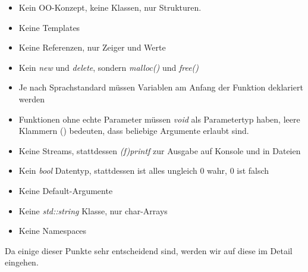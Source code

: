 \documentclass[
  accentcolor=tud1c,	%
  colorbacktitle,		%
  inverttitle,			%
  german,				%
  twoside
]{tudexercise}
\begin{document}
\begin{itemize}
\item Kein OO-Konzept, keine Klassen, nur Strukturen.
\item Keine Templates
\item Keine Referenzen, nur Zeiger und Werte
\item Kein \emph{new} und \emph{delete}, sondern \emph{malloc()} und \emph{free()}
\item Je nach Sprachstandard müssen Variablen am Anfang der Funktion deklariert werden
\item Funktionen ohne echte Parameter müssen \emph{void} als Parametertyp haben, leere Klammern () bedeuten, dass beliebige Argumente erlaubt sind.
\item Keine Streams, stattdessen \emph{(f)printf} zur Ausgabe auf Konsole und in Dateien
\item Kein \emph{bool} Datentyp, stattdessen ist alles ungleich 0 wahr, 0 ist falsch
\item Keine Default-Argumente
\item Keine \emph{std::string} Klasse, nur char-Arrays
\item Keine Namespaces
\end{itemize}

Da einige dieser Punkte sehr entscheidend sind, werden wir auf diese im Detail eingehen.
\end{document}
